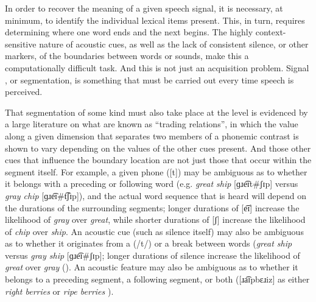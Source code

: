 In order to recover the meaning of a given speech signal, it is necessary,
at minimum, to identify the individual lexical items present. This,
in turn, requires determining where one word ends and the next begins.
The highly context-sensitive nature of acoustic cues, as well as the
lack of consistent silence, or other markers, of the boundaries between
words or sounds, make this a computationally difficult task. And this
is not just an acquisition problem. Signal , or segmentation,
is something that must be carried out every time speech is perceived. 

That segmentation of some kind must also take place at the 
level is evidenced by a large literature on what are known as “trading
relations”, in which the value along a given  dimension
that separates two members of a phonemic contrast is shown to vary
depending on the values of the other  cues present. And those
other cues that influence the boundary location are not just those
that occur within the segment itself. For example, a given phone ({[t]})
may be ambiguous as to whether it belongs with a preceding or following
word (e.g. \textit{great ship} {[}{ɡɹe͡ɪt}\#{ʃɪp}{]}
versus \textit{gray chip} {[}{ɡɹe͡ɪ}\#{t͡ʃɪp}{]}),
and the actual word sequence that is heard will depend on the durations
of the surrounding segments; longer durations of {[e͡ɪ]}
increase the likelihood of \textit{gray} over \textit{great}, while
shorter durations of {[ʃ]} increase the likelihood of \textit{chip}
over \textit{ship}. An acoustic cue (such as silence itself) may also
be ambiguous as to whether it originates from a  ({/t/})
or a break between words (\textit{great ship} versus \textit{gray ship}
{[}{ɡɹe͡ɪ}\#{ʃɪp}{]}; longer durations of silence
increase the likelihood of \textit{great} over \textit{gray} (\citealt{repp1978perceptual}).
An acoustic feature may also be ambiguous as to whether it belongs
to a preceding segment, a following segment, or both ({[}{ɹa͡ɪpbɛɹiz}{]}
as either \textit{right berries} or \textit{ripe berries} \citealt{Gow2003}). 


